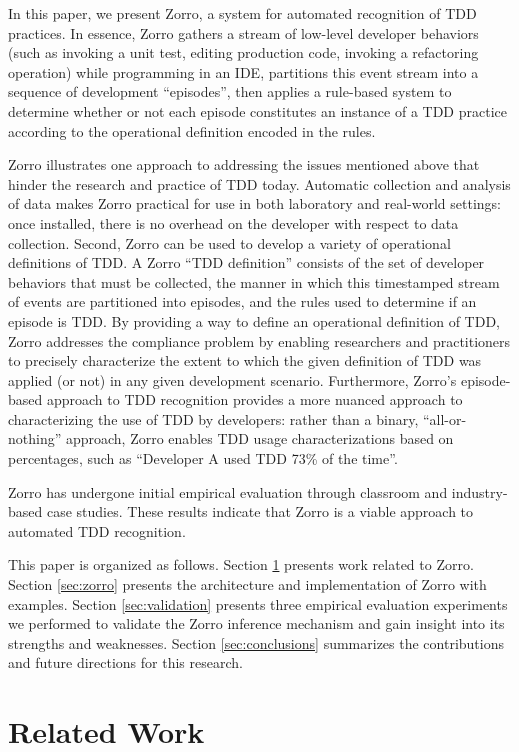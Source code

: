 \documentclass[smallextended]{svjour3}     %
\begin{document}
In this paper, we present Zorro, a system for automated recognition of TDD
practices.  In essence, Zorro gathers a stream of low-level developer
behaviors (such as invoking a unit test, editing production code, invoking
a refactoring operation) while programming in an IDE, partitions this event
stream into a sequence of development ``episodes'', then applies a
rule-based system to determine whether or not each episode constitutes an
instance of a TDD practice according to the operational definition encoded in the rules.

Zorro illustrates one approach to addressing the issues mentioned above
that hinder the research and practice of TDD today.  Automatic collection
and analysis of data makes Zorro practical for use in both laboratory and
real-world settings: once installed, there is no overhead on the developer
with respect to data collection.  Second, Zorro can be used to develop a
variety of operational definitions of TDD. A Zorro ``TDD definition''
consists of the set of developer behaviors that must be collected, the
manner in which this timestamped stream of events are partitioned into
episodes, and the rules used to determine if an episode is TDD.  By
providing a way to define an operational definition of TDD, Zorro addresses
the compliance problem by enabling researchers and practitioners to
precisely characterize the extent to which the given definition of TDD was
applied (or not) in any given development scenario.  Furthermore, Zorro's
episode-based approach to TDD recognition provides a more nuanced approach
to characterizing the use of TDD by developers: rather than a binary,
``all-or-nothing'' approach, Zorro enables TDD usage characterizations
based on percentages, such as ``Developer A used TDD 73\% of the time''.

Zorro has undergone initial empirical evaluation through classroom and
industry-based case studies.  These results indicate that Zorro is a viable
approach to automated TDD recognition.

This paper is organized as follows.  Section \ref{sec:RelatedWork} presents
work related to Zorro.  Section \ref{sec:zorro} presents the architecture and implementation of Zorro with examples. 
Section \ref{sec:validation} presents three empirical evaluation experiments we performed to validate the 
Zorro inference mechanism and gain insight into its strengths and weaknesses.  
Section \ref{sec:conclusions} summarizes the contributions and future directions for this research. 

\section{Related Work}
\label{sec:RelatedWork}
\end{document}
